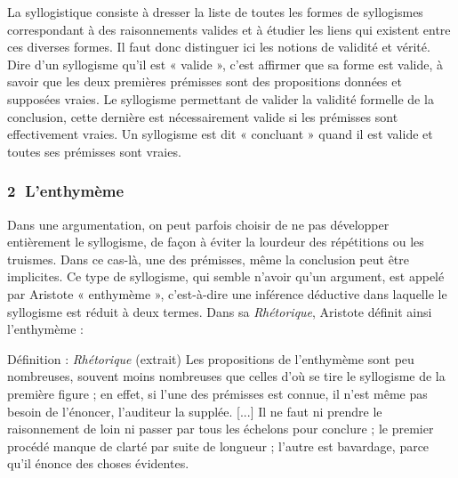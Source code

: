 La syllogistique consiste à dresser la liste de toutes les formes de syllogismes correspondant à des raisonnements valides et à étudier les liens qui existent entre ces diverses formes. Il faut donc distinguer ici les notions de validité et vérité. Dire d’un syllogisme qu’il est « valide », c’est affirmer que sa forme est valide, à savoir que les deux premières prémisses sont des propositions données et supposées vraies. Le syllogisme permettant de valider la validité formelle de la conclusion, cette dernière est nécessairement valide si les prémisses sont effectivement vraies. Un syllogisme est dit « concluant » quand il est valide et toutes ses prémisses sont vraies.

\subsubsection*{\textcircled{\scriptsize 2} L’enthymème}
Dans une argumentation, on peut parfois choisir de ne pas développer entièrement le syllogisme, de façon à éviter la lourdeur des répétitions ou les truismes. Dans ce cas-là, une des prémisses, même la conclusion peut être implicites. Ce type de syllogisme, qui semble n’avoir qu’un argument, est appelé par Aristote « enthymème », c’est-à-dire une inférence déductive dans laquelle le syllogisme est réduit à deux termes. Dans sa \textit{Rhétorique}, Aristote définit ainsi l’enthymème :

\begin{lecture}{Définition : \textit{Rhétorique} (extrait)}
Les propositions de l’enthymème sont peu nombreuses, souvent moins nombreuses que celles d’où se tire le syllogisme de la première figure ; en effet, si l’une des prémisses est connue, il n’est même pas besoin de l’énoncer, l’auditeur la supplée. [...] Il ne faut ni prendre le raisonnement de loin ni passer par tous les échelons pour conclure ; le premier procédé manque de clarté par suite de longueur ; l’autre est bavardage, parce qu’il énonce des choses évidentes.
\end{lecture}

